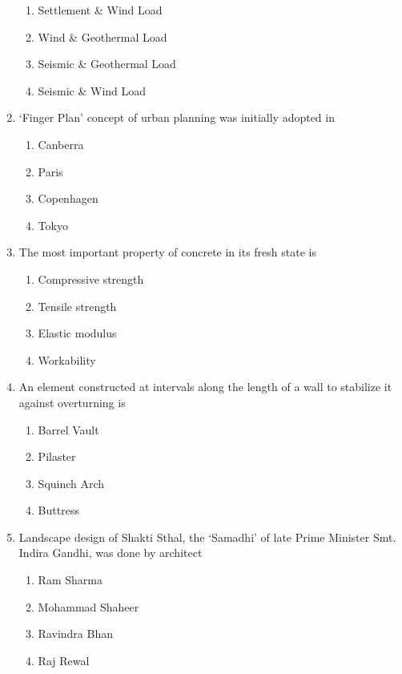 \documentclass[journal,12pt,onecolumn]{IEEEtran}
\theoremstyle{remark}
\begin{document}
\begin{enumerate}
\hfill{}
\begin{enumerate}
\item Settlement \& Wind Load
\item Wind \& Geothermal Load
\item Seismic \& Geothermal Load
\item Seismic \& Wind Load
\end{enumerate}

\item ‘Finger Plan’ concept of urban planning was initially adopted in

\hfill{}
\begin{enumerate}
\item Canberra
\item Paris
\item Copenhagen
\item Tokyo
\end{enumerate}

\item The most important property of concrete in its fresh state is

\hfill{}
\begin{enumerate}
\item Compressive strength
\item Tensile strength
\item Elastic modulus
\item Workability
\end{enumerate}

\item An element constructed at intervals along the length of a wall to stabilize it against overturning is

\hfill{}
\begin{enumerate}
\item Barrel Vault
\item Pilaster
\item Squinch Arch
\item Buttress
\end{enumerate}

\item Landscape design of Shakti Sthal, the ‘Samadhi’ of late Prime Minister Smt. Indira Gandhi, was done by architect

\hfill{}
\begin{enumerate}
\item Ram Sharma
\item Mohammad Shaheer
\item Ravindra Bhan
\item Raj Rewal
\end{enumerate}


\end{enumerate}
\end{document}
